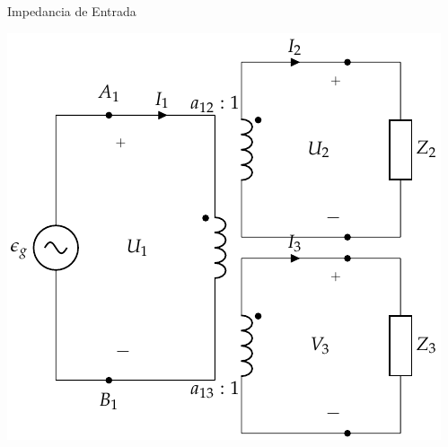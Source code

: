 \documentclass[aspectratio=169, usenames,svgnames,dvipsnames]{beamer}
\begin{document}
\begin{frame}[label={sec:orgb0c60cf}]{Impedancia de Entrada}
\begin{center}
\includegraphics[height=0.9\textheight]{../figs/TrafoIdealVariosDevanados_Impedancia.pdf}
\end{center}
\end{frame}
\end{document}
